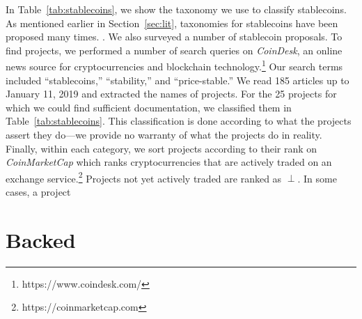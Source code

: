 In Table~\ref{tab:stablecoins}, we show the taxonomy we use to classify stablecoins. As mentioned earlier in Section~\ref{sec:lit}, taxonomies for stablecoins have been proposed many times. . We also surveyed a number of stablecoin proposals. To find projects, we performed a number of search queries on \textit{CoinDesk}, an online news source for cryptocurrencies and blockchain technology.\footnote{https://www.coindesk.com/} Our search terms included ``stablecoins,'' ``stability,'' and ``price-stable.'' We read 185 articles up to January 11, 2019 and extracted the names of projects. For the 25 projects for which we could find sufficient documentation, we classified them in Table~\ref{tab:stablecoins}. This classification is done according to what the projects assert they do---we provide no warranty of what the projects do in reality. Finally, within each category, we sort projects according to their rank on \textit{CoinMarketCap} which ranks cryptocurrencies that are actively traded on an exchange service.\footnote{https://coinmarketcap.com} Projects not yet actively traded are ranked as $\perp$. In some cases, a project 






\section{Backed}



